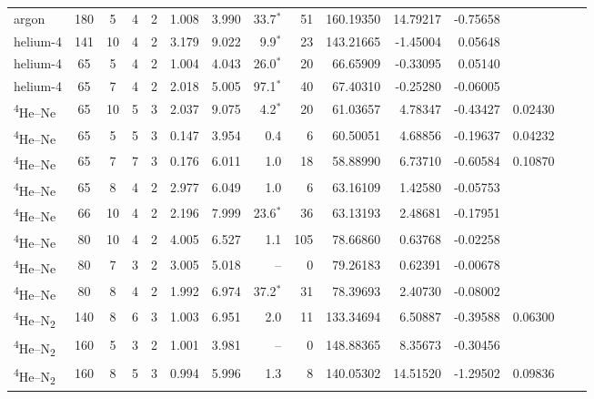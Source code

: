 \begin{table}
\begin{tabular}{lccccccrrD{.}{.}{3.5}D{.}{.}{2.5}D{.}{.}{2.5}D{.}{.}{2.5}D{.}{.}{2.5}D{.}{.}{2.5}}
    argon & 180 & 5 & 4 & 2 & 1.008 & 3.990 & 33.7$^{*}$ & 51 & 160.19350 & 14.79217 & -0.75658 &  &  &  \\
    helium-4 & 141 & 10 & 4 & 2 & 3.179 & 9.022 & 9.9$^{*}$ & 23 & 143.21665 & -1.45004 & 0.05648 &  &  &  \\
    helium-4 & 65 & 5 & 4 & 2 & 1.004 & 4.043 & 26.0$^{*}$ & 20 & 66.65909 & -0.33095 & 0.05140 &  &  &  \\
    helium-4 & 65 & 7 & 4 & 2 & 2.018 & 5.005 & 97.1$^{*}$ & 40 & 67.40310 & -0.25280 & -0.06005 &  &  &  \\
    \textsuperscript{4}He--Ne & 65 & 10 & 5 & 3 & 2.037 & 9.075 & 4.2$^{*}$ & 20 & 61.03657 & 4.78347 & -0.43427 & 0.02430 &  &  \\
    \textsuperscript{4}He--Ne & 65 & 5 & 5 & 3 & 0.147 & 3.954 & 0.4 & 6 & 60.50051 & 4.68856 & -0.19637 & 0.04232 &  &  \\
    \textsuperscript{4}He--Ne & 65 & 7 & 7 & 3 & 0.176 & 6.011 & 1.0 & 18 & 58.88990 & 6.73710 & -0.60584 & 0.10870 &  &  \\
    \textsuperscript{4}He--Ne & 65 & 8 & 4 & 2 & 2.977 & 6.049 & 1.0 & 6 & 63.16109 & 1.42580 & -0.05753 &  &  &  \\
    \textsuperscript{4}He--Ne & 66 & 10 & 4 & 2 & 2.196 & 7.999 & 23.6$^{*}$ & 36 & 63.13193 & 2.48681 & -0.17951 &  &  &  \\
    \textsuperscript{4}He--Ne & 80 & 10 & 4 & 2 & 4.005 & 6.527 & 1.1 & 105 & 78.66860 & 0.63768 & -0.02258 &  &  &  \\
    \textsuperscript{4}He--Ne & 80 & 7 & 3 & 2 & 3.005 & 5.018 & -- & 0 & 79.26183 & 0.62391 & -0.00678 &  &  &  \\
    \textsuperscript{4}He--Ne & 80 & 8 & 4 & 2 & 1.992 & 6.974 & 37.2$^{*}$ & 31 & 78.39693 & 2.40730 & -0.08002 &  &  &  \\
    \textsuperscript{4}He--N\textsubscript{2} & 140 & 8 & 6 & 3 & 1.003 & 6.951 & 2.0 & 11 & 133.34694 & 6.50887 & -0.39588 & 0.06300 &  &  \\
    \textsuperscript{4}He--N\textsubscript{2} & 160 & 5 & 3 & 2 & 1.001 & 3.981 & -- & 0 & 148.88365 & 8.35673 & -0.30456 &  &  &  \\
    \textsuperscript{4}He--N\textsubscript{2} & 160 & 8 & 5 & 3 & 0.994 & 5.996 & 1.3 & 8 & 140.05302 & 14.51520 & -1.29502 & 0.09836 &  &  \\
    \bottomrule
  \end{tabular}
\end{table}

